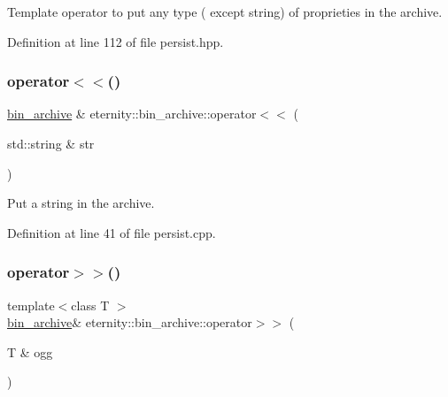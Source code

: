 Template operator to put any type ( except string) of proprieties in the archive. 

Definition at line 112 of file persist.\+hpp.

\mbox{\label{classeternity_1_1bin__archive_a5cc61f7f70b1d809fbece79ccb9ecb26}} 
\subsubsection{\texorpdfstring{operator$<$$<$()}{operator<<()}\hspace{0.1cm}{\footnotesize\ttfamily [2/2]}}
{\footnotesize\ttfamily \hyperlink{classeternity_1_1bin__archive}{bin\+\_\+archive} \& eternity\+::bin\+\_\+archive\+::operator$<$$<$ (\begin{DoxyParamCaption}\item[{std\+::string \&}]{str }\end{DoxyParamCaption})}



Put a string in the archive. 



Definition at line 41 of file persist.\+cpp.

\mbox{\label{classeternity_1_1bin__archive_a8c431d394555d953019fe1f35ca77ffd}} 
\subsubsection{\texorpdfstring{operator$>$$>$()}{operator>>()}\hspace{0.1cm}{\footnotesize\ttfamily [1/2]}}
{\footnotesize\ttfamily template$<$class T $>$ \\
\hyperlink{classeternity_1_1bin__archive}{bin\+\_\+archive}\& eternity\+::bin\+\_\+archive\+::operator$>$$>$ (\begin{DoxyParamCaption}\item[{T \&}]{ogg }\end{DoxyParamCaption})\hspace{0.3cm}{\ttfamily [inline]}}

